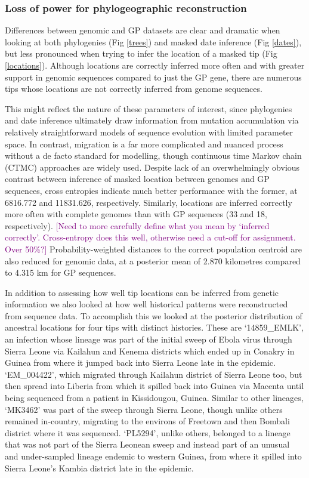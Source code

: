 \documentclass[11pt,oneside,letterpaper]{article}
\def\tbc#1{\textcolor{purple}{[#1]}}
\begin{document}
\subsubsection*{Loss of power for phylogeographic reconstruction}

Differences between genomic and GP datasets are clear and dramatic when looking at both phylogenies (Fig \ref{trees}) and masked date inference (Fig \ref{dates}), but less pronounced when trying to infer the location of a masked tip (Fig \ref{locations}).
Although locations are correctly inferred more often and with greater support in genomic sequences compared to just the GP gene, there are numerous tips whose locations are not correctly inferred from genome sequences.

This might reflect the nature of these parameters of interest, since phylogenies and date inference ultimately draw information from mutation accumulation via relatively straightforward models of sequence evolution with limited parameter space.
In contrast, migration is a far more complicated and nuanced process without a de facto standard for modelling, though continuous time Markov chain (CTMC) approaches are widely used.
Despite lack of an overwhelmingly obvious contrast between inference of masked location between genomes and GP sequences, cross entropies indicate much better performance with the former, at 6816.772 and 11831.626, respectively.
Similarly, locations are inferred correctly more often with complete genomes than with GP sequences (33 and 18, respectively).
\tbc{Need to more carefully define what you mean by `inferred correctly'. Cross-entropy does this well, otherwise need a cut-off for assignment. Over 50\%?}
Probability-weighted distances to the correct population centroid are also reduced for genomic data, at a posterior mean of 2.870 kilometres compared to 4.315 km for GP sequences.

In addition to assessing how well tip locations can be inferred from genetic information we also looked at how well historical patterns were reconstructed from sequence data.
To accomplish this we looked at the posterior distribution of ancestral locations for four tips with distinct histories.
These are `14859\_EMLK', an infection whose lineage was part of the initial sweep of Ebola virus through Sierra Leone via Kailahun and Kenema districts which ended up in Conakry in Guinea from where it jumped back into Sierra Leone late in the epidemic.
`EM\_004422', which migrated through Kailahun district of Sierra Leone too, but then spread into Liberia from which it spilled back into Guinea via Macenta until being sequenced from a patient in Kissidougou, Guinea.
Similar to other lineages, `MK3462' was part of the sweep through Sierra Leone, though unlike others remained in-country, migrating to the environs of Freetown and then Bombali district where it was sequenced.
`PL5294', unlike others, belonged to a lineage that was not part of the Sierra Leonean sweep and instead part of an unusual and under-sampled lineage endemic to western Guinea, from where it spilled into Sierra Leone's Kambia district late in the epidemic.
\end{document}
